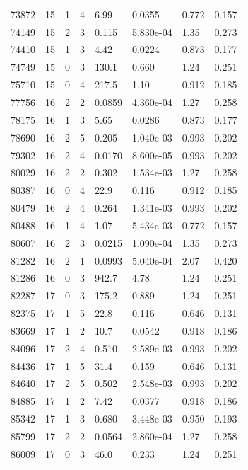 \documentclass[preview]{standalone}
\begin{document}
{{{{\begin{tabular}{L{1.2cm}C{1.2cm} C{0.3cm}C{0.5cm} C{1.4cm}C{1.4cm} C{1.4cm}C{1.4cm}}
  73872  &    15  & 1     &  4 &  6.99  & 0.0355  & 0.772 &  0.157   \\ 
  74149  &    15  & 2     &  3 &  0.115  & 5.830e-04  & 1.35 &  0.273   \\ 
  74410  &    15  & 1     &  3 &  4.42  & 0.0224  & 0.873 &  0.177   \\ 
  74749  &    15  & 0     &  3 &  130.1  & 0.660  & 1.24 &  0.251   \\ 
  75710  &    15  & 0     &  4 &  217.5  & 1.10  & 0.912 &  0.185   \\ 
  77756  &    16  & 2     &  2 &  0.0859  & 4.360e-04  & 1.27 &  0.258   \\ 
  78175  &    16  & 1     &  3 &  5.65  & 0.0286  & 0.873 &  0.177   \\ 
  78690  &    16  & 2     &  5 &  0.205  & 1.040e-03  & 0.993 &  0.202   \\ 
  79302  &    16  & 2     &  4 &  0.0170  & 8.600e-05  & 0.993 &  0.202   \\ 
  80029  &    16  & 2     &  2 &  0.302  & 1.534e-03  & 1.27 &  0.258   \\ 
  80387  &    16  & 0     &  4 &  22.9  & 0.116  & 0.912 &  0.185   \\ 
  80479  &    16  & 2     &  4 &  0.264  & 1.341e-03  & 0.993 &  0.202   \\ 
  80488  &    16  & 1     &  4 &  1.07  & 5.434e-03  & 0.772 &  0.157   \\ 
  80607  &    16  & 2     &  3 &  0.0215  & 1.090e-04  & 1.35 &  0.273   \\ 
  81282  &    16  & 2     &  1 &  0.0993  & 5.040e-04  & 2.07 &  0.420   \\ 
  81286  &    16  & 0     &  3 &  942.7  & 4.78  & 1.24 &  0.251   \\ 
  82287  &    17  & 0     &  3 &  175.2  & 0.889  & 1.24 &  0.251   \\ 
  82375  &    17  & 1     &  5 &  22.8  & 0.116  & 0.646 &  0.131   \\ 
  83669  &    17  & 1     &  2 &  10.7  & 0.0542  & 0.918 &  0.186   \\ 
  84096  &    17  & 2     &  4 &  0.510  & 2.589e-03  & 0.993 &  0.202   \\ 
  84436  &    17  & 1     &  5 &  31.4  & 0.159  & 0.646 &  0.131   \\ 
  84640  &    17  & 2     &  5 &  0.502  & 2.548e-03  & 0.993 &  0.202   \\ 
  84885  &    17  & 1     &  2 &  7.42  & 0.0377  & 0.918 &  0.186   \\ 
  85342  &    17  & 1     &  3 &  0.680  & 3.448e-03  & 0.950 &  0.193   \\ 
  85799  &    17  & 2     &  2 &  0.0564  & 2.860e-04  & 1.27 &  0.258   \\ 
  86009  &    17  & 0     &  3 &  46.0  & 0.233  & 1.24 &  0.251   \\ 
\hline 
\end{tabular} 

}}}}
\end{document}
